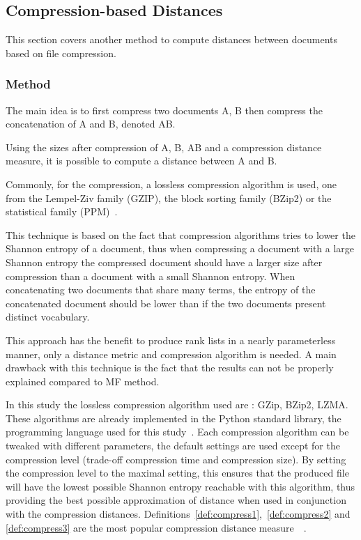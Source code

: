 \subsection{Compression-based Distances \label{sec:compression_based_distances}}

This section covers another method to compute distances between documents based on file compression.

\subsubsection{Method}

The main idea is to first compress two documents A, B then compress the concatenation of A and B, denoted AB.

Using the sizes after compression of A, B, AB and a compression distance measure, it is possible to compute a distance between A and B.

Commonly, for the compression, a lossless compression algorithm is used, one from the Lempel-Ziv family (GZIP), the block sorting family (BZip2) or the statistical family (PPM)~\cite{comparing_compression}.

This technique is based on the fact that compression algorithms tries to lower the Shannon entropy of a document, thus when compressing a document with a large Shannon entropy the compressed document should have a larger size after compression than a document with a small Shannon entropy.
When concatenating two documents that share many terms, the entropy of the concatenated document should be lower than if the two documents present distinct vocabulary.

This approach has the benefit to produce rank lists in a nearly parameterless manner, only a distance metric and compression algorithm is needed.
A main drawback with this technique is the fact that the results can not be properly explained compared to MF method.

In this study the lossless compression algorithm used are : GZip, BZip2, LZMA.
These algorithms are already implemented in the Python standard library, the programming language used for this study~\cite{python_standard_library}.
Each compression algorithm can be tweaked with different parameters, the default settings are used except for the compression level (trade-off compression time and compression size).
By setting the compression level to the maximal setting, this ensures that the produced file will have the lowest possible Shannon entropy reachable with this algorithm, thus providing the best possible approximation of distance when used in conjunction with the compression distances.
Definitions~\ref{def:compress1},~\ref{def:compress2} and \ref{def:compress3} are the most popular compression distance measure~\cite{comparing_compression}~\cite{savoy_stylo}.

